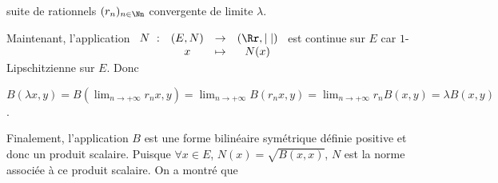 {{suite de rationnels $(r_n)_{n\in\Nn}$ convergente de limite $\lambda$.

Maintenant, l'application $\begin{array}[t]{cccc}N~:&(E,N)&\rightarrow&(\Rr,|\;|)\\
 &x&\mapsto&N(x)
 \end{array}$ est continue sur $E$ car $1$-Lipschitzienne sur $E$. Donc
 
\begin{center}
$B(\lambda x,y) =B(\lim_{n \rightarrow +\infty}r_nx,y)=\lim_{n \rightarrow +\infty}B(r_nx,y)=\lim_{n \rightarrow +\infty}r_nB(x,y)=\lambda B(x,y)$.
\end{center}

Finalement, l'application $B$ est une forme bilinéaire symétrique définie positive et donc un produit scalaire. Puisque $\forall x\in E$, $N(x)=\sqrt{B(x,x)}$, $N$ est la norme associée à ce produit scalaire. On a montré que

\begin{center}
\end{center}
}
}
